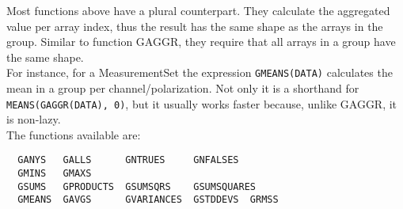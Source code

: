 Most functions above have a plural counterpart. They calculate the aggregated
value per array index, thus the result has the same shape as the
arrays in the group. Similar to function GAGGR, they require that all
arrays in a group have the same shape. 
\\For instance, for a MeasurementSet the expression
\texttt{GMEANS(DATA)} calculates the mean in a group per channel/polarization.
Not only it is a shorthand for \texttt{MEANS(GAGGR(DATA), 0)}, but it
usually works faster because, unlike GAGGR, it is non-lazy.
\\The functions available are:
\begin{verbatim}
  GANYS   GALLS      GNTRUES     GNFALSES
  GMINS   GMAXS
  GSUMS   GPRODUCTS  GSUMSQRS    GSUMSQUARES
  GMEANS  GAVGS      GVARIANCES  GSTDDEVS  GRMSS
\end{verbatim}


